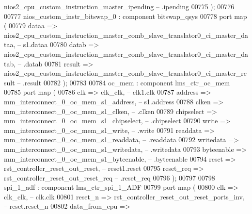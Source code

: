 \begin{DoxyCode}
      nios2_cpu_custom_instruction_master_ipending             \textcolor{keyword}{--                          .ipending}
00775         \textcolor{vhdlchar}{)};
00776 
00777     nios_custom_instr_bitswap_0 : \textcolor{keywordflow}{component} bitswap\_qsys
00778         \textcolor{keywordflow}{port} \textcolor{keywordflow}{map} (
00779             dataa  => 
      nios2_cpu_custom_instruction_master_comb_slave_translator0_ci_master_dataa,\textcolor{keyword}{  -- s1.dataa}
00780             datab  => 
      nios2_cpu_custom_instruction_master_comb_slave_translator0_ci_master_datab,\textcolor{keyword}{  --   .datab}
00781             result => 
      nios2_cpu_custom_instruction_master_comb_slave_translator0_ci_master_result  \textcolor{keyword}{--   .result}
00782         \textcolor{vhdlchar}{)};
00783 
00784     oc_mem : \textcolor{keywordflow}{component} lms\_ctr\_oc\_mem
00785         \textcolor{keywordflow}{port} \textcolor{keywordflow}{map} (
00786             clk        => clk_clk,\textcolor{keyword}{                                --   clk1.clk}
00787             address    => mm_interconnect_0_oc_mem_s1_address,\textcolor{keyword}{    --     s1.address}
00788             clken      => mm_interconnect_0_oc_mem_s1_clken,\textcolor{keyword}{      --       .clken}
00789             chipselect => mm_interconnect_0_oc_mem_s1_chipselect,\textcolor{keyword}{ --       .chipselect}
00790             write      => mm_interconnect_0_oc_mem_s1_write,\textcolor{keyword}{      --       .write}
00791             readdata   => mm_interconnect_0_oc_mem_s1_readdata,\textcolor{keyword}{   --       .readdata}
00792             writedata  => mm_interconnect_0_oc_mem_s1_writedata,\textcolor{keyword}{  --       .writedata}
00793             byteenable => mm_interconnect_0_oc_mem_s1_byteenable,\textcolor{keyword}{ --       .byteenable}
00794             reset      => rst_controller_reset_out_reset,\textcolor{keyword}{         -- reset1.reset}
00795             reset\_req  => rst_controller_reset_out_reset_req      \textcolor{keyword}{--       .reset\_req}
00796         \textcolor{vhdlchar}{)};
00797 
00798     spi_1_adf : \textcolor{keywordflow}{component} lms\_ctr\_spi\_1\_ADF
00799         \textcolor{keywordflow}{port} \textcolor{keywordflow}{map} (
00800             clk           => clk_clk,\textcolor{keyword}{                                                      --             
       clk.clk}
00801             reset\_n       => rst_controller_reset_out_reset_ports_inv,\textcolor{keyword}{                     --           
       reset.reset\_n}
00802             data\_from\_cpu => 

\end{DoxyCode}
